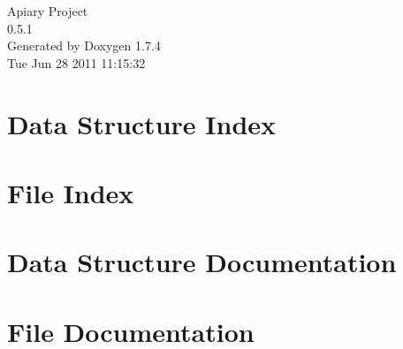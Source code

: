 \documentclass[a4paper]{book}
\begin{document}
\hypersetup{pageanchor=false}
\begin{titlepage}
\vspace*{7cm}
\begin{center}
{\Large Apiary Project \\[1ex]\large 0.5.1 }\\
\vspace*{1cm}
{\large Generated by Doxygen 1.7.4}\\
\vspace*{0.5cm}
{\small Tue Jun 28 2011 11:15:32}\\
\end{center}
\end{titlepage}
\clearemptydoublepage
{}
\tableofcontents
\clearemptydoublepage
{}
\hypersetup{pageanchor=true}
\chapter{Data Structure Index}

\chapter{File Index}

\chapter{Data Structure Documentation}



\chapter{File Documentation}















\printindex
\end{document}
